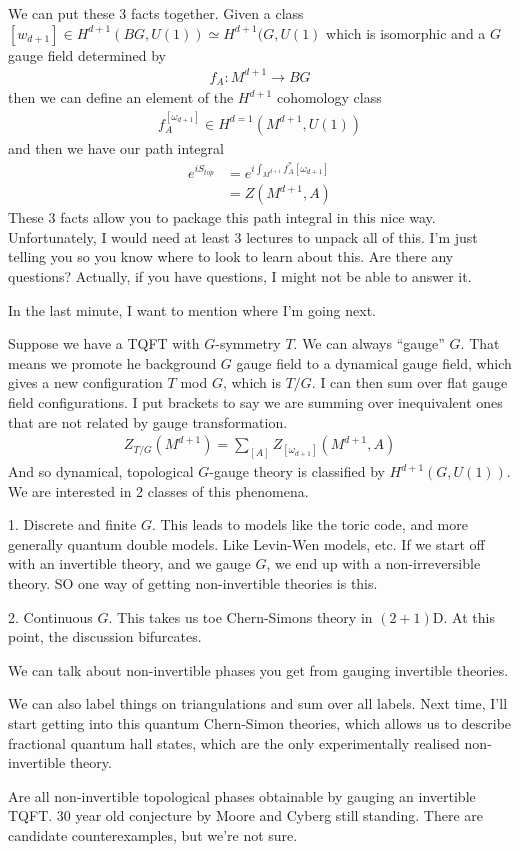 We can put these 3 facts together.
Given a class $[w_{d+1}] \in H^{d+1}\left( BG, U(1) \right) \simeq H^{d+1}(G,
U(1)$
which is isomorphic
and a $G$ gauge field determined by
\begin{align}
    f_A: M^{d+1} \to BG
\end{align}
then we can define an element of the $H^{d+1}$ cohomology class
\begin{align}
    f_A^\left[ \omega_{d+1} \right]
    \in
    H^{d=1}\left( M^{d+1}, U(1) \right)
\end{align}
and then we have our path integral
\begin{align}
    e^{iS_{top}}
    &=
    e^{i\int_{M^{d+1}} f_A^*\left[ \omega_{d+1} \right]}\\
    &= Z\left( M^{d+1}, A \right)
\end{align}
These 3 facts allow you to package this path integral in this nice way.
Unfortunately,
I would need at least 3 lectures to unpack all of this.
I'm just telling you so you know where to look to learn about this.
Are there any questions?
Actually,
if you have questions,
I might not be able to answer it.

In the last minute,
I want to mention where I'm going next.

Suppose we have a TQFT with $G$-symmetry $T$.
We can always ``gauge'' $G$.
That means we promote he background $G$ gauge field to a dynamical gauge field,
which gives a new configuration $T$ mod $G$,
which is $T/G$.
I can then sum over flat gauge field configurations.
I put brackets to say we are summing over inequivalent ones that are not related
by gauge transformation.
\begin{align}
    Z_{T/G}\left( M^{d+1} \right)
    =
    \sum_{\left[ A \right]}
    Z_{\left[ \omega_{d+1} \right]}
    \left( M^{d+1}, A \right)
\end{align}
And so dynamical, topological $G$-gauge theory is classified by
$H^{d+1}\left( G, U(1) \right)$.
We are interested in 2 classes of this phenomena.

1. Discrete and finite $G$.
This leads to models like the toric code,
and more generally quantum double models.
Like Levin-Wen models, etc.
If we start off with an invertible theory,
and we gauge $G$,
we end up with a non-irreversible theory.
SO one way of getting non-invertible theories is this.

2. Continuous $G$.
This takes us toe Chern-Simons theory in $(2+1)$D.
At this point,
the discussion bifurcates.

We can talk about non-invertible phases
you get from gauging invertible theories.

We can also label things on triangulations and sum over all labels.
Next time,
I'll start getting into this quantum Chern-Simon theories,
which allows us to describe fractional quantum hall states,
which are the only experimentally realised non-invertible theory.

Are all non-invertible topological phases obtainable by gauging an invertible
TQFT.
30 year old conjecture by Moore and Cyberg still standing.
There are candidate counterexamples,
but we're not sure.
